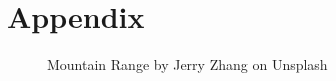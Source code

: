 \onecolumn
\section{Appendix}

\begin{figure}[!htb]
	\caption{\label{fig:1} Mountain Range by Jerry Zhang on Unsplash}
\end{figure}
